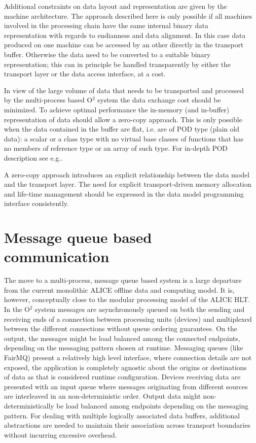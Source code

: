 \documentclass[a4paper,twoside]{article}
\def\O2{O$^2$}
\begin{document}
Additional constraints on data layout and representation are given by the machine architecture. The approach described here is only possible if all machines involved in the processing chain have the same internal binary data representation with regards to endianness and data alignment. In this case data produced on one machine can be accessed by an other directly in the transport buffer. Otherwise the data need to be converted to a suitable binary representation; this can in principle be handled transparently by either the transport layer or the data access interface, at a cost.

In view of the large volume of data that needs to be transported and processed by the multi-process based \O2 system the data exchange cost should be minimized. To achieve optimal performance the in-memory (and in-buffer) representation of data should allow a zero-copy approach. This is only possible when the data contained in the buffer are flat, i.e. are of POD type (plain old data): a scalar or a class type with no virtual base classes of functions that has no members of reference type or an array of such type. For in-depth POD description see e.g.\cite{POD}.

A zero-copy approach introduces an explicit relationship between the data model and the transport layer. The need for explicit transport-driven memory allocation and life-time management should be expressed in the data model programming interface consistently.

\section{Message queue based communication}
The move to a multi-process, message queue based system is a large departure from the current monolithic ALICE offline data and computing model. It is, however, conceptually close to the modular processing model of the ALICE HLT.
In the \O2 system messages are asynchronously queued on both the sending and receiving ends of a connection between processing units (devices) and multiplexed between the different connections without queue ordering guarantees. On the output, the messages might be load balanced among the connected endpoints, depending on the messaging pattern chosen at runtime.
Messaging queues (like FairMQ) present a relatively high level interface, where connection details are not exposed, the application is completely agnostic about the origins or destinations of data as that is considered runtime configuration.
Devices receiving data are presented with an input queue where messages originating from different sources are interleaved in an non-deterministic order. Output data might non-deterministically be load balanced among endpoints depending on the messaging pattern.
For dealing with multiple logically associated data buffers, additional abstractions are needed to maintain their association across transport boundaries without incurring excessive overhead.
\end{document}
